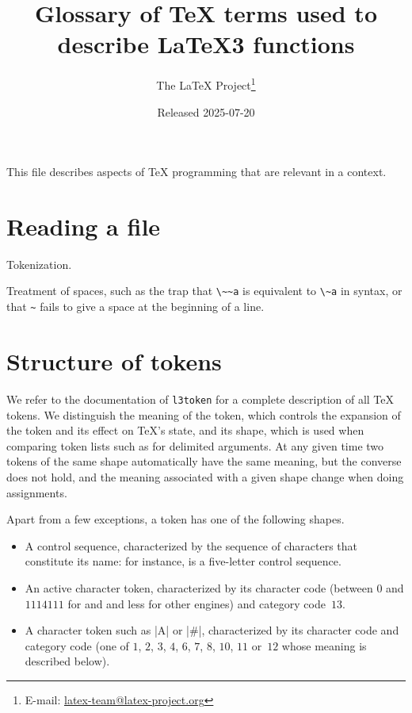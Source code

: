 \documentclass{l3doc}
\title{%
  Glossary of \TeX{} terms used to describe \LaTeX3 functions%
}
\author{%
  The \LaTeX{} Project\thanks
    {%
      E-mail:
      \href{mailto:latex-team@latex-project.org}%
        {latex-team@latex-project.org}%
    }%
}
\date{Released 2025-07-20}
\begin{document}
\maketitle

This file describes aspects of \TeX{} programming that are relevant in a
 context.

\section{Reading a file}

Tokenization.

Treatment of spaces, such as the trap that \verb|\~~a| is equivalent to
\verb|\~a| in  syntax, or that \verb|~| fails to give a space at the
beginning of a line.

\section{Structure of tokens}

We refer to the documentation of \texttt{l3token} for a complete
description of all \TeX{} tokens.  We distinguish the meaning of the
token, which controls the expansion of the token and its effect on
\TeX{}'s state, and its shape, which is used when comparing token lists
such as for delimited arguments.  At any given time two tokens of the
same shape automatically have the same meaning, but the converse does
not hold, and the meaning associated with a given shape change when
doing assignments.

Apart from a few exceptions, a token has one of the following shapes.
\begin{itemize}
  \item A control sequence, characterized by the sequence of characters
    that constitute its name: for instance,  is a five-letter
    control sequence.
  \item An active character token, characterized by its character code
    (between $0$ and $1114111$ for \LuaTeX{} and \XeTeX{} and less for
    other engines) and category code~$13$.
  \item A character token such as |A| or |#|, characterized by its
    character code and category code (one of $1$, $2$, $3$, $4$, $6$,
    $7$, $8$, $10$, $11$ or~$12$ whose meaning is described below).
\end{itemize}
\end{document}
